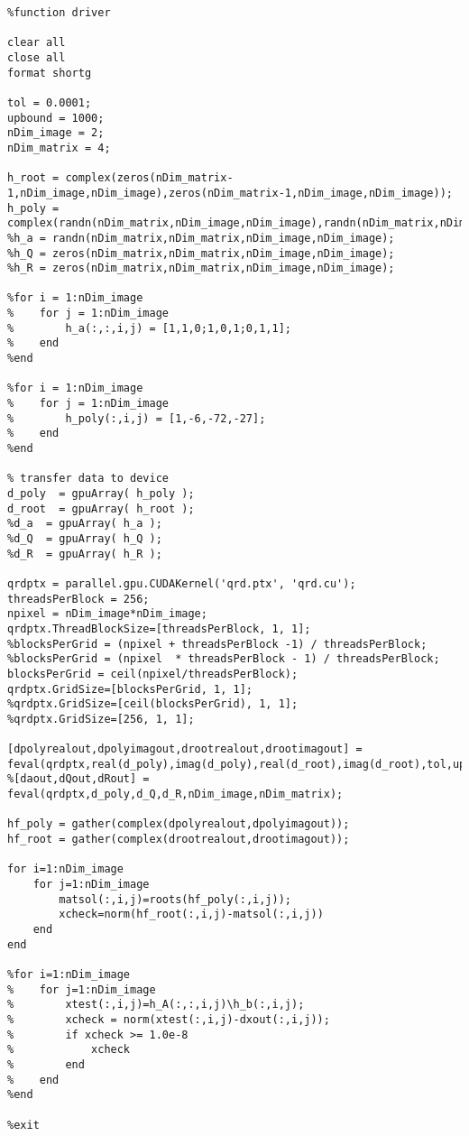\documentclass{article}
\begin{document}
\lstset{language=Matlab}
\begin{lstlisting}
%function driver

clear all
close all
format shortg

tol = 0.0001;
upbound = 1000;
nDim_image = 2;
nDim_matrix = 4;

h_root = complex(zeros(nDim_matrix-1,nDim_image,nDim_image),zeros(nDim_matrix-1,nDim_image,nDim_image));
h_poly = complex(randn(nDim_matrix,nDim_image,nDim_image),randn(nDim_matrix,nDim_image,nDim_image));
%h_a = randn(nDim_matrix,nDim_matrix,nDim_image,nDim_image);
%h_Q = zeros(nDim_matrix,nDim_matrix,nDim_image,nDim_image);
%h_R = zeros(nDim_matrix,nDim_matrix,nDim_image,nDim_image);

%for i = 1:nDim_image
%    for j = 1:nDim_image
%        h_a(:,:,i,j) = [1,1,0;1,0,1;0,1,1];
%    end
%end

%for i = 1:nDim_image
%    for j = 1:nDim_image
%        h_poly(:,i,j) = [1,-6,-72,-27];
%    end
%end

% transfer data to device
d_poly  = gpuArray( h_poly );
d_root  = gpuArray( h_root );
%d_a  = gpuArray( h_a );
%d_Q  = gpuArray( h_Q );
%d_R  = gpuArray( h_R );

qrdptx = parallel.gpu.CUDAKernel('qrd.ptx', 'qrd.cu');
threadsPerBlock = 256;
npixel = nDim_image*nDim_image;
qrdptx.ThreadBlockSize=[threadsPerBlock, 1, 1];
%blocksPerGrid = (npixel + threadsPerBlock -1) / threadsPerBlock;
%blocksPerGrid = (npixel  * threadsPerBlock - 1) / threadsPerBlock;
blocksPerGrid = ceil(npixel/threadsPerBlock);
qrdptx.GridSize=[blocksPerGrid, 1, 1];
%qrdptx.GridSize=[ceil(blocksPerGrid), 1, 1];
%qrdptx.GridSize=[256, 1, 1];

[dpolyrealout,dpolyimagout,drootrealout,drootimagout] = feval(qrdptx,real(d_poly),imag(d_poly),real(d_root),imag(d_root),tol,upbound,nDim_image,nDim_matrix);
%[daout,dQout,dRout] = feval(qrdptx,d_poly,d_Q,d_R,nDim_image,nDim_matrix);

hf_poly = gather(complex(dpolyrealout,dpolyimagout));
hf_root = gather(complex(drootrealout,drootimagout));

for i=1:nDim_image
	for j=1:nDim_image
		matsol(:,i,j)=roots(hf_poly(:,i,j));
		xcheck=norm(hf_root(:,i,j)-matsol(:,i,j))
	end
end

%for i=1:nDim_image
%    for j=1:nDim_image
%        xtest(:,i,j)=h_A(:,:,i,j)\h_b(:,i,j);
%        xcheck = norm(xtest(:,i,j)-dxout(:,i,j));
%        if xcheck >= 1.0e-8 
%            xcheck
%        end
%    end
%end

%exit
\end{lstlisting}
\end{document}
